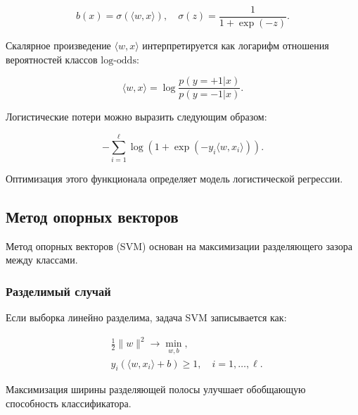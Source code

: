 \begin{equation}
b(x) = \sigma(\langle w, x \rangle), \quad \sigma(z) = \frac{1}{1 + \exp(-z)}.
\end{equation}

Скалярное произведение \( \langle w, x \rangle \) интерпретируется как
логарифм отношения вероятностей классов \( \text{log-odds} \):

\begin{equation}
\langle w, x \rangle = \log \frac{p(y = +1 | x)}{p(y = -1 | x)}.
\end{equation}

Логистические потери можно выразить следующим образом:

\begin{equation}
-\sum_{i=1}^\ell \log(1 + \exp(-y_i \langle w, x_i \rangle)).
\end{equation}

Оптимизация этого функционала определяет модель логистической регрессии.

\hypertarget{ux43cux435ux442ux43eux434-ux43eux43fux43eux440ux43dux44bux445-ux432ux435ux43aux442ux43eux440ux43eux432}{%
\subsection*{Метод опорных
векторов}\label{ux43cux435ux442ux43eux434-ux43eux43fux43eux440ux43dux44bux445-ux432ux435ux43aux442ux43eux440ux43eux432}}

Метод опорных векторов (SVM) основан на максимизации разделяющего зазора
между классами.

\hypertarget{ux440ux430ux437ux434ux435ux43bux438ux43cux44bux439-ux441ux43bux443ux447ux430ux439}{%
\subsubsection*{Разделимый
случай}\label{ux440ux430ux437ux434ux435ux43bux438ux43cux44bux439-ux441ux43bux443ux447ux430ux439}}

Если выборка линейно разделима, задача SVM записывается как:

\begin{equation}
\begin{aligned}
&\frac{1}{2} \|w\|^2 \to \min_{w, b}, \\
&y_i (\langle w, x_i \rangle + b) \geq 1, \quad i = 1, \ldots, \ell.
\end{aligned}
\end{equation}

Максимизация ширины разделяющей полосы улучшает обобщающую способность
классификатора.

